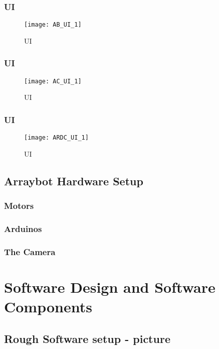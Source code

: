 \documentclass[11pt,fleqn]{book} %
\begin{document}
\subsection{\ab{} UI}

\begin{sidewaysfigure}[h]
\centering\texttt{[image: AB\_UI\_1]}
\caption{\ab{} UI}
\end{sidewaysfigure}

\clearpage

\subsection{\ac{} UI}

\begin{sidewaysfigure}[h]
\centering\texttt{[image: AC\_UI\_1]}
\caption{\ac{} UI}
\end{sidewaysfigure}

\clearpage
\subsection{\abc{} UI}
\begin{sidewaysfigure}[h]
\centering\texttt{[image: ARDC\_UI\_1]}
\caption{\abc{} UI}
\end{sidewaysfigure}

\clearpage


\section{Arraybot Hardware Setup}

\subsection{Motors}
\subsection{Arduinos}
\subsection{The Camera}




\chapter{Software Design and Software Components}

\section{Rough Software setup - picture}
\end{document}
